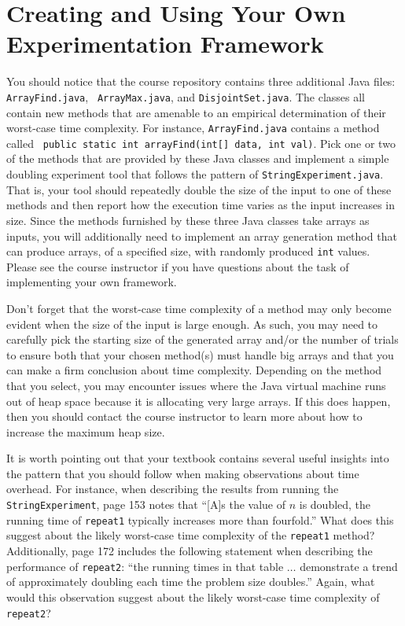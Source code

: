 \section*{Creating and Using Your Own Experimentation Framework}

You should notice that the course repository contains three additional Java files: {\tt ArrayFind.java}, {\tt
ArrayMax.java}, and {\tt DisjointSet.java}. The classes all contain new methods that are amenable to an empirical
determination of their worst-case time complexity. For instance, {\tt ArrayFind.java} contains a method called {\tt
public static int arrayFind(int[] data, int val)}.  Pick one or two of the methods that are provided by these Java
classes and implement a simple doubling experiment tool that follows the pattern of {\tt StringExperiment.java}. That
is, your tool should repeatedly double the size of the input to one of these methods and then report how the execution
time varies as the input increases in size. Since the methods furnished by these three Java classes take arrays as
inputs, you will additionally need to implement an array generation method that can produce arrays, of a specified size,
with randomly produced {\tt int} values.  Please see the course instructor if you have questions about the task of
implementing your own framework.

Don't forget that the worst-case time complexity of a method may only become evident when the size of the input is large
enough. As such, you may need to carefully pick the starting size of the generated array and/or the number of trials to
ensure both that your chosen method(s) must handle big arrays and that you can make a firm conclusion about time
complexity.  Depending on the method that you select, you may encounter issues where the Java virtual machine runs out of
heap space because it is allocating very large arrays. If this does happen, then you should contact the course
instructor to learn more about how to increase the maximum heap size.

It is worth pointing out that your textbook contains several useful insights into the pattern that you should follow
when making observations about time overhead. For instance, when describing the results from running the {\tt
StringExperiment}, page 153 notes that ``[A]s the value of $n$ is doubled, the running time of {\tt repeat1} typically
increases more than fourfold.'' What does this suggest about the likely worst-case time complexity of the {\tt repeat1}
method? Additionally, page 172 includes the following statement when describing the performance of {\tt repeat2}: ``the
running times in that table $\ldots$ demonstrate a trend of approximately doubling each time the problem size doubles.''
Again, what would this observation suggest about the likely worst-case time complexity of {\tt repeat2}? 

